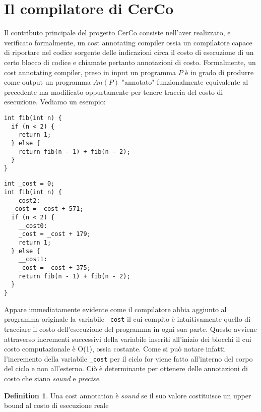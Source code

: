 \documentclass[12pt,a4paper,openright,oneside]{report}
\theoremstyle{definition}
\newtheorem{definition}{Definition}
\begin{document}
\section{Il compilatore di CerCo}\label{cerco:compiler}
Il contributo principale del progetto CerCo consiste nell'aver realizzato, e verificato formalmente, un cost annotating compiler ossia un compilatore capace di riportare nel codice sorgente delle indicazioni circa il costo di esecuzione di un certo blocco di codice e chiamate pertanto annotazioni di costo. Formalmente, un cost annotating compiler, preso in input un programma $P$ \`{e} in grado di produrre come output un programma $An(P)$ "annotato" funzionalmente equivalente al precedente ma modificato oppurtamente per tenere traccia del costo di esecuzione. Vediamo un esempio:\\
\begin{minipage}{.45\textwidth}
\begin{lstlisting}[caption=Sorgente originale,frame=tlrb]
int fib(int n) {
  if (n < 2) {
    return 1;
  } else {
    return fib(n - 1) + fib(n - 2);
  }
}
\end{lstlisting}
\end{minipage}\hfill
\begin{minipage}{.45\textwidth}
\begin{lstlisting}[caption=Codice annotato,label={lst:cerco_instrumented},frame=tlrb]
int _cost = 0;
int fib(int n) {
  __cost2:
  _cost = _cost + 571;
  if (n < 2) {
    __cost0:
    _cost = _cost + 179;
    return 1;
  } else {
    __cost1:
    _cost = _cost + 375;
    return fib(n - 1) + fib(n - 2);
  }
}
\end{lstlisting}
\end{minipage}
Appare immediatamente evidente come il compilatore abbia aggiunto al programma originale la variabile \texttt{\_cost} il cui compito \`{e} intuitivamente quello di tracciare il costo dell'esecuzione del programma in ogni sua parte. Questo avviene attraverso incrementi successivi della variabile inseriti all'inizio dei blocchi il cui costo computazionale \`{e} O(1), ossia costante. Come si pu\`{o} notare infatti l'incremento della variabile \texttt{\_cost} per il ciclo for viene fatto all'interno del corpo del ciclo e non all'esterno. Ci\`{o} \`{e} determinante per ottenere delle annotazioni di costo che siano \textit{sound} e \textit{precise}.
\begin{definition} 
Una cost annotation \`{e} \textit{sound} se il suo valore costituisce un upper bound al costo di esecuzione reale
\end{definition}
\end{document}
